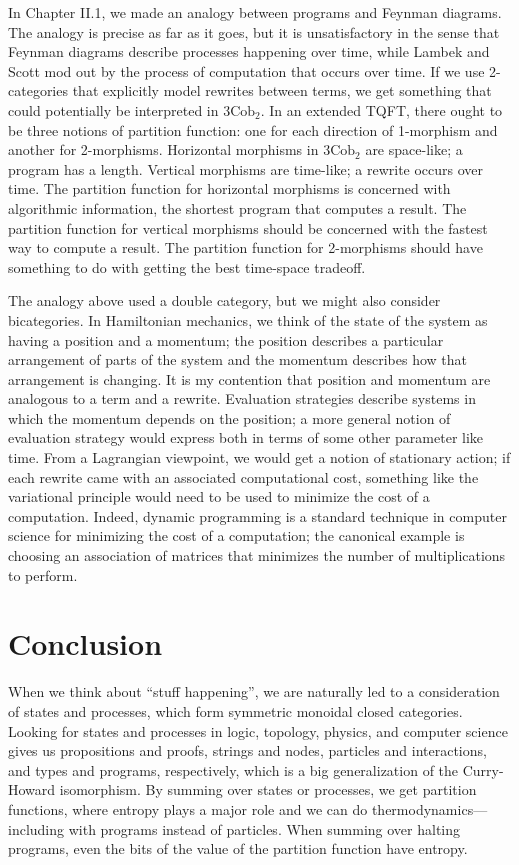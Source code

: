 \documentclass[12pt,twoside,openright]{report}
\newcommand{\Cob}{\mathrm{Cob}}
\begin{document}
In Chapter II.1, we made an analogy between programs and Feynman diagrams.  The analogy is precise as far as it goes, but it is unsatisfactory in the sense that Feynman diagrams describe processes happening over time, while Lambek and Scott mod out by the process of computation that occurs over time.  If we use 2-categories that explicitly model rewrites between terms, we get something that could potentially be interpreted in $3\Cob_2$.  In an extended TQFT, there ought to be three notions of partition function: one for each direction of 1-morphism and another for 2-morphisms.  Horizontal morphisms in $3\Cob_2$ are space-like; a program has a length.  Vertical morphisms are time-like; a rewrite occurs over time.  The partition function for horizontal morphisms is concerned with algorithmic information, the shortest program that computes a result.  The partition function for vertical morphisms should be concerned with the fastest way to compute a result.  The partition function for 2-morphisms should have something to do with getting the best time-space tradeoff.

The analogy above used a double category, but we might also consider bicategories.  In Hamiltonian mechanics, we think of the state of the system as having a position and a momentum; the position describes a particular arrangement of parts of the system and the momentum describes how that arrangement is changing.  It is my contention that position and momentum are analogous to a term and a rewrite.  Evaluation strategies describe systems in which the momentum depends on the position; a more general notion of evaluation strategy would express both in terms of some other parameter like time.  From a Lagrangian viewpoint, we would get a notion of stationary action; if each rewrite came with an associated computational cost, something like the variational principle would need to be used to minimize the cost of a computation.  Indeed, dynamic programming is a standard technique in computer science for minimizing the cost of a computation; the canonical example is choosing an association of matrices that minimizes the number of multiplications to perform.

\chapter*{Conclusion}

When we think about ``stuff happening'', we are naturally led to a consideration of states and processes, which form symmetric monoidal closed categories.  Looking for states and processes in logic, topology, physics, and computer science gives us propositions and proofs, strings and nodes, particles and interactions, and types and programs, respectively, which is a big generalization of the Curry-Howard isomorphism.  By summing over states or processes, we get partition functions, where entropy plays a major role and we can do thermodynamics---including with programs instead of particles.  When summing over halting programs, even the bits of the value of the partition function have entropy.  
\end{document}

